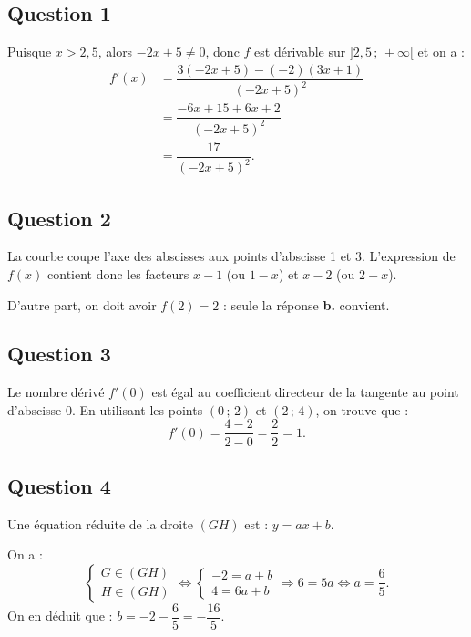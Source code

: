 \subsection*{Question 1}

Puisque \( x > 2{,}5 \), alors \( -2x + 5 \neq 0 \), donc \( f \) est dérivable sur \( ]2{,}5 \,;\, +\infty[ \) et on a :
\begin{align*}
f'(x) &= \dfrac{3(-2x + 5) - (-2)(3x + 1)}{(-2x + 5)^2} \\
&= \dfrac{-6x + 15 + 6x + 2}{(-2x + 5)^2} \\
&= \dfrac{17}{(-2x + 5)^2}.
\end{align*}

\subsection*{Question 2}

La courbe coupe l'axe des abscisses aux points d'abscisse 1 et 3. L'expression de \( f(x) \) contient donc les facteurs \( x - 1 \) (ou \( 1 - x \)) et \( x - 2 \) (ou \( 2 - x \)).

D'autre part, on doit avoir \( f(2) = 2 \) : seule la réponse \textbf{b.} convient.

\subsection*{Question 3}

Le nombre dérivé \( f'(0) \) est égal au coefficient directeur de la tangente au point d'abscisse 0. En utilisant les points \( (0\,;\,2) \) et \( (2\,;\,4) \), on trouve que :
\[
f'(0) = \dfrac{4 - 2}{2 - 0} = \dfrac{2}{2} = 1.
\]

\subsection*{Question 4}

Une équation réduite de la droite \( (GH) \) est : \( y = ax + b \).

On a :
\[
\begin{cases}
G \in (GH) \\
H \in (GH)
\end{cases}
\iff 
\begin{cases}
-2 = a + b \\
4 = 6a + b
\end{cases}
\Rightarrow 6 = 5a \iff a = \dfrac{6}{5}.
\]
On en déduit que : \( b = -2 - \dfrac{6}{5} = -\dfrac{16}{5} \).

